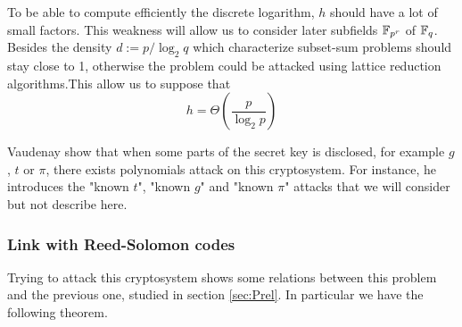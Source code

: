 \documentclass[a4paper]{article}
\begin{document}
To be able to compute efficiently the discrete logarithm, $h$ should have a lot of small factors. This weakness will allow us to consider later subfields $\mathbb{F}_{p^r}$ of $\mathbb{F}_q$. Besides the density $d := p / \log_2 q$ which characterize subset-sum problems should stay close to 1, otherwise the problem could be attacked using lattice reduction algorithms.This allow us to suppose that
$$ h = \Theta\left( \frac{p}{\log_2 p} \right) $$

Vaudenay show that when some parts of the secret key is disclosed, for example $g$, $t$ or $\pi$, there exists polynomials attack on this cryptosystem. For instance, he introduces the "known $t$", "known $g$" and "known $\pi$" attacks that we will consider but not describe here.


\subsubsection{Link with Reed-Solomon codes}

Trying to attack this cryptosystem shows some relations between this problem and the previous one, studied in section \ref{sec:Prel}. In particular we have the following theorem.
\end{document}
